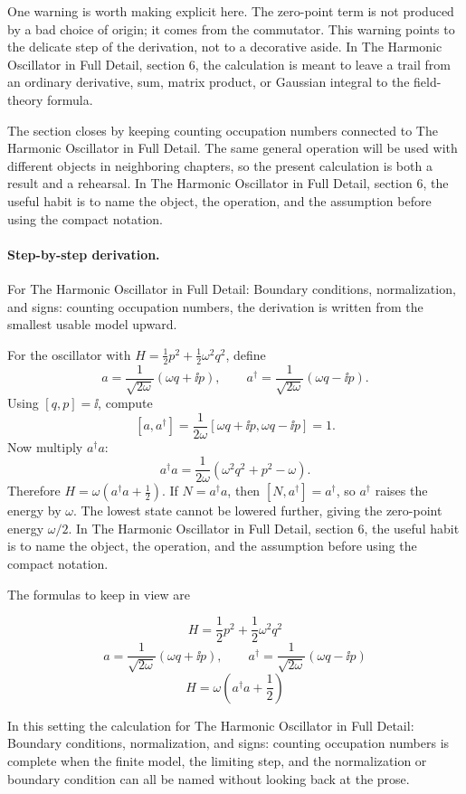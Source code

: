 One warning is worth making explicit here.  The zero-point term is not produced by a bad choice of origin; it comes from the commutator.  This warning points to the delicate step of the derivation, not to a decorative aside.  In The Harmonic Oscillator in Full Detail, section 6, the calculation is meant to leave a trail from an ordinary derivative, sum, matrix product, or Gaussian integral to the field-theory formula.

The section closes by keeping counting occupation numbers connected to The Harmonic Oscillator in Full Detail.  The same general operation will be used with different objects in neighboring chapters, so the present calculation is both a result and a rehearsal.  In The Harmonic Oscillator in Full Detail, section 6, the useful habit is to name the object, the operation, and the assumption before using the compact notation.



\paragraph{Step-by-step derivation.}

For The Harmonic Oscillator in Full Detail: Boundary conditions, normalization, and signs: counting occupation numbers, the derivation is written from the smallest usable model upward.

For the oscillator with \(H=\frac12p^2+\frac12\omega^2q^2\), define
\[
  a=\frac{1}{\sqrt{2\omega}}(\omega q+\ii p),\qquad
  a^\dagger=\frac{1}{\sqrt{2\omega}}(\omega q-\ii p).
\]
Using \([q,p]=\ii\), compute
\[
  [a,a^\dagger]
  =
  \frac{1}{2\omega}[\omega q+\ii p,\omega q-\ii p]=1.
\]
Now multiply \(a^\dagger a\):
\[
  a^\dagger a=\frac{1}{2\omega}(\omega^2q^2+p^2-\omega).
\]
Therefore \(H=\omega(a^\dagger a+\frac12)\).  If \(N=a^\dagger a\), then \([N,a^\dagger]=a^\dagger\), so \(a^\dagger\) raises the energy by \(\omega\).  The lowest state cannot be lowered further, giving the zero-point energy \(\omega/2\).  In The Harmonic Oscillator in Full Detail, section 6, the useful habit is to name the object, the operation, and the assumption before using the compact notation.

The formulas to keep in view are

\[
  H=\frac12p^2+\frac12\omega^2q^2
\]
\[
  a=\frac{1}{\sqrt{2\omega}}(\omega q+\ii p),\qquad a^\dagger=\frac{1}{\sqrt{2\omega}}(\omega q-\ii p)
\]
\[
  H=\omega\left(a^\dagger a+\frac12\right)
\]

In this setting the calculation for The Harmonic Oscillator in Full Detail: Boundary conditions, normalization, and signs: counting occupation numbers is complete when the finite model, the limiting step, and the normalization or boundary condition can all be named without looking back at the prose.




